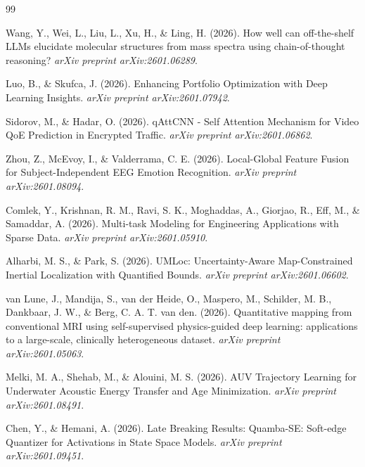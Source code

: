 \documentclass[11pt]{article}
\begin{document}
\begin{thebibliography}{99}

Wang, Y., Wei, L., Liu, L., Xu, H., \& Ling, H. (2026). How well can off-the-shelf LLMs elucidate molecular structures from mass spectra using chain-of-thought reasoning? \emph{arXiv preprint arXiv:2601.06289}.

Luo, B., \& Skufca, J. (2026). Enhancing Portfolio Optimization with Deep Learning Insights. \emph{arXiv preprint arXiv:2601.07942}.

Sidorov, M., \& Hadar, O. (2026). qAttCNN - Self Attention Mechanism for Video QoE Prediction in Encrypted Traffic. \emph{arXiv preprint arXiv:2601.06862}.

Zhou, Z., McEvoy, I., \& Valderrama, C. E. (2026). Local-Global Feature Fusion for Subject-Independent EEG Emotion Recognition. \emph{arXiv preprint arXiv:2601.08094}.

Comlek, Y., Krishnan, R. M., Ravi, S. K., Moghaddas, A., Giorjao, R., Eff, M., \& Samaddar, A. (2026). Multi-task Modeling for Engineering Applications with Sparse Data. \emph{arXiv preprint arXiv:2601.05910}.

Alharbi, M. S., \& Park, S. (2026). UMLoc: Uncertainty-Aware Map-Constrained Inertial Localization with Quantified Bounds. \emph{arXiv preprint arXiv:2601.06602}.

van Lune, J., Mandija, S., van der Heide, O., Maspero, M., Schilder, M. B., Dankbaar, J. W., \& Berg, C. A. T. van den. (2026). Quantitative mapping from conventional MRI using self-supervised physics-guided deep learning: applications to a large-scale, clinically heterogeneous dataset. \emph{arXiv preprint arXiv:2601.05063}.

Melki, M. A., Shehab, M., \& Alouini, M. S. (2026). AUV Trajectory Learning for Underwater Acoustic Energy Transfer and Age Minimization. \emph{arXiv preprint arXiv:2601.08491}.

Chen, Y., \& Hemani, A. (2026). Late Breaking Results: Quamba-SE: Soft-edge Quantizer for Activations in State Space Models. \emph{arXiv preprint arXiv:2601.09451}.


\end{thebibliography}
\end{document}
